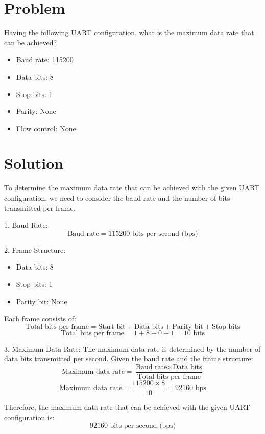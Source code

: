 \section*{Problem}
Having the following UART configuration, what is the maximum data rate that can be achieved?
\begin{itemize}
    \item Baud rate: 115200
    \item Data bits: 8
    \item Stop bits: 1
    \item Parity: None
    \item Flow control: None
\end{itemize}

\section*{Solution}
To determine the maximum data rate that can be achieved with the given UART configuration, we need to consider the baud rate and the number of bits transmitted per frame.

1. Baud Rate:
\[
\text{Baud rate} = 115200 \text{ bits per second (bps)}
\]

2. Frame Structure:
\begin{itemize}
    \item Data bits: 8
    \item Stop bits: 1
    \item Parity bit: None
\end{itemize}

Each frame consists of:
\[
\text{Total bits per frame} = \text{Start bit} + \text{Data bits} + \text{Parity bit} + \text{Stop bits}
\]
\[
\text{Total bits per frame} = 1 + 8 + 0 + 1 = 10 \text{ bits}
\]

3. Maximum Data Rate:
The maximum data rate is determined by the number of data bits transmitted per second. Given the baud rate and the frame structure:
\[
\text{Maximum data rate} = \frac{\text{Baud rate} \times \text{Data bits}}{\text{Total bits per frame}}
\]
\[
\text{Maximum data rate} = \frac{115200 \times 8}{10} = 92160 \text{ bps}
\]

Therefore, the maximum data rate that can be achieved with the given UART configuration is:
\[
92160 \text{ bits per second (bps)}
\]
